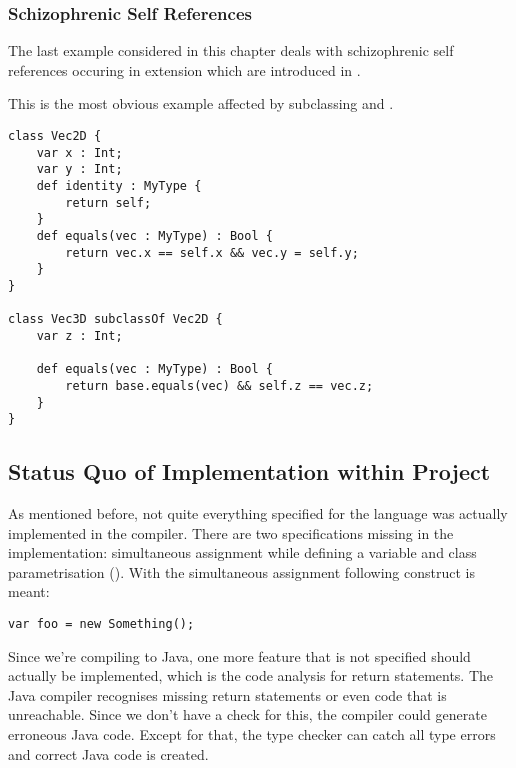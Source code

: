 \subsubsection{Schizophrenic Self References}
The last example considered in this chapter deals with schizophrenic self
references occuring in extension which are introduced in .

This is the most obvious example affected by subclassing and \mytype.

\begin{lstlisting}[float=ht,language=ooplss,caption=Avoid schizophrenic self references with \mytype.,label=lst:solveSchizo]
class Vec2D {
	var x : Int;
	var y : Int;
	def identity : MyType {
		return self;
	}
	def equals(vec : MyType) : Bool {
		return vec.x == self.x && vec.y = self.y;
	}
}

class Vec3D subclassOf Vec2D {
	var z : Int;

	def equals(vec : MyType) : Bool {
		return base.equals(vec) && self.z == vec.z;
	}
}
\end{lstlisting}


\subsection{Status Quo of Implementation within Project}
\label{sec:statusQuo}

As mentioned before, not quite everything specified for the language
was actually implemented in the compiler. There are two specifications missing
in the implementation: simultaneous assignment while defining a variable
and class parametrisation (). With the simultaneous
assignment following construct is meant:

\begin{lstlisting}[float=ht,language=ooplss,caption=Assignment on defining a variable.,label=lst:vardefAssign]
var foo = new Something();
\end{lstlisting}

Since we're compiling to Java, one more feature that
is not specified should actually be implemented, which is the code analysis
for return statements. The Java compiler recognises missing return statements
or even code that is unreachable. Since we don't have a check for this, the
compiler could generate erroneous Java code. Except for that, the type checker
can catch all type errors and correct Java code is created.

